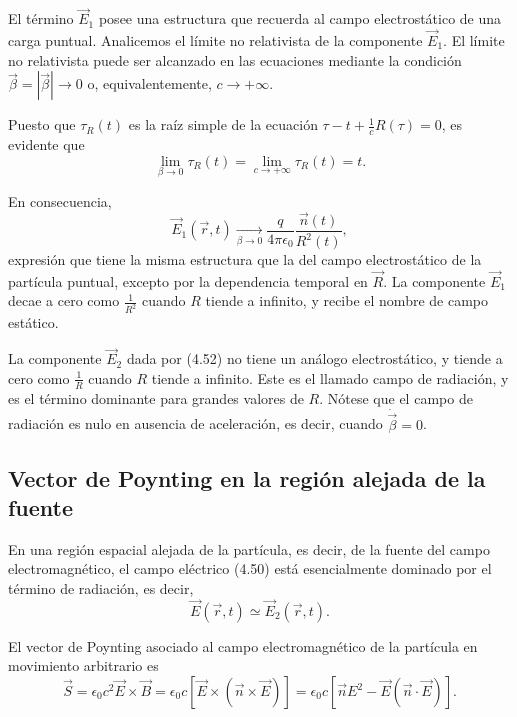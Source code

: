 \documentclass[12pt,a4paper]{book}
\begin{document}
El término $\vec{E}_1$ posee una estructura que recuerda al campo electrostático de una carga puntual. Analicemos el límite no relativista de la componente $\vec{E}_1$. El límite no relativista puede ser alcanzado en las ecuaciones mediante la condición $\vec{\beta} = |\vec{\beta}| \to 0$ o, equivalentemente, $c \to +\infty$.

Puesto que $\tau_R(t)$ es la raíz simple de la ecuación $\tau - t + \frac{1}{c}R(\tau) = 0$, es evidente que
\begin{equation}
\lim_{\beta \to 0}\tau_R(t) = \lim_{c \to +\infty}\tau_R(t) = t.
\end{equation}

En consecuencia,
\begin{equation}
\vec{E}_1(\vec{r}, t) \xrightarrow[\beta \to 0]{} \frac{q}{4\pi\epsilon_0}\frac{\vec{n}(t)}{R^2(t)},
\end{equation}
expresión que tiene la misma estructura que la del campo electrostático de la partícula puntual, excepto por la dependencia temporal en $\vec{R}$. La componente $\vec{E}_1$ decae a cero como $\frac{1}{R^2}$ cuando $R$ tiende a infinito, y recibe el nombre de campo estático.

La componente $\vec{E}_2$ dada por (4.52) no tiene un análogo electrostático, y tiende a cero como $\frac{1}{R}$ cuando $R$ tiende a infinito. Este es el llamado campo de radiación, y es el término dominante para grandes valores de $R$. Nótese que el campo de radiación es nulo en ausencia de aceleración, es decir, cuando $\dot{\vec{\beta}} = 0$.

\subsection{Vector de Poynting en la región alejada de la fuente}

En una región espacial alejada de la partícula, es decir, de la fuente del campo electromagnético, el campo eléctrico (4.50) está esencialmente dominado por el término de radiación, es decir,
\begin{equation}
\vec{E}(\vec{r}, t) \simeq \vec{E}_2(\vec{r}, t).
\end{equation}

El vector de Poynting asociado al campo electromagnético de la partícula en movimiento arbitrario es
\begin{equation}
\vec{S} = \epsilon_0 c^2\vec{E} \times \vec{B} = \epsilon_0 c\left[\vec{E} \times (\vec{n} \times \vec{E})\right] = \epsilon_0 c\left[\vec{n}E^2 - \vec{E}(\vec{n} \cdot \vec{E})\right].
\end{equation}
\end{document}
